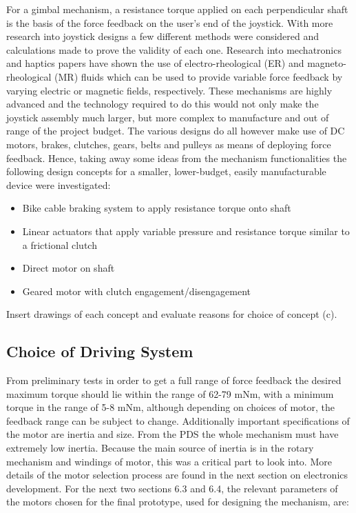 For a gimbal mechanism, a resistance torque applied on each perpendicular shaft is
the basis of the force feedback on the user’s end of the joystick. With more
research into joystick designs a few different methods were considered and
calculations made to prove the validity of each one. Research into mechatronics
and haptics papers have shown the use of electro-rheological (ER) and magneto-rheological (MR) fluids which
can be used to provide variable force feedback by varying electric or magnetic
fields, respectively. These mechanisms are highly advanced and the technology
required to do this would not only make the joystick assembly much larger, but
more complex to manufacture and out of range of the project budget. The various designs do all however make use of DC motors, brakes, clutches, gears, belts and pulleys as means of deploying force feedback. Hence, taking away some ideas from the mechanism functionalities the following design concepts for a smaller, lower-budget, easily manufacturable device were investigated:

\begin{itemize}
  \item Bike cable braking system to apply resistance torque onto shaft
  \item Linear actuators that apply variable pressure and resistance torque similar to a frictional clutch
  \item Direct motor on shaft
  \item Geared motor with clutch engagement/disengagement
\end{itemize}

Insert drawings of each concept and evaluate reasons for choice of concept (c).


\subsection{Choice of Driving System} %
\label{sub:choice_of_driving_system}


From preliminary tests in order to get a full range of force feedback the desired maximum
torque should lie within the range of 62-79 mNm, with a minimum torque in the range of 5-8 mNm,
although depending on choices of motor, the feedback range can be subject to change.
Additionally important specifications of the motor are inertia and size. From the PDS the whole
mechanism must have extremely low inertia. Because the main source of inertia is in the rotary
mechanism and windings of motor, this was a critical part to look into. More details of the
motor selection process are found in the next section on electronics development. For the next
two sections 6.3 and 6.4, the relevant parameters of the motors chosen for the final prototype,
used for designing the mechanism, are:

